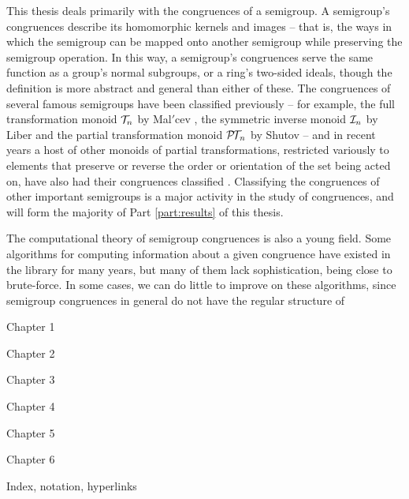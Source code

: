 This thesis deals primarily with the congruences of a semigroup.  A semigroup's
congruences describe its homomorphic kernels and images -- that is, the ways in
which the semigroup can be mapped onto another semigroup while preserving the
semigroup operation.  In this way, a semigroup's congruences serve the same
function as a group's normal subgroups, or a ring's two-sided ideals, though the
definition is more abstract and general than either of these.  The congruences
of several famous semigroups have been classified previously -- for example, the
full transformation monoid $\mathcal{T}_n$ by Mal$'$cev \cite{malcev_1952}, the symmetric
inverse monoid $\mathcal{I}_n$ by Liber \cite{liber_1953} and the partial transformation
monoid $\mathcal{P\!T\!}_n$ by Shutov \cite{shutov_1988} -- and in recent years a host of
other monoids of partial transformations, restricted variously to elements that
preserve or reverse the order or orientation of the set being acted on, have
also had their congruences classified \cite{fernandes_2000, lisbon_ii,
  lisbon_i}.  Classifying the congruences of other important semigroups is a
major activity in the study of congruences, and will form the majority of Part
\ref{part:results} of this thesis.

The computational theory of semigroup congruences is also a young field.  Some
algorithms for computing information about a given congruence have existed in
the \GAP{} library for many years, but many of them lack sophistication, being
close to brute-force.  In some cases, we can do little to improve on these
algorithms, since semigroup congruences in general do not have the regular
structure of

Chapter 1

Chapter 2

Chapter 3

Chapter 4

Chapter 5

Chapter 6

Index, notation, hyperlinks

